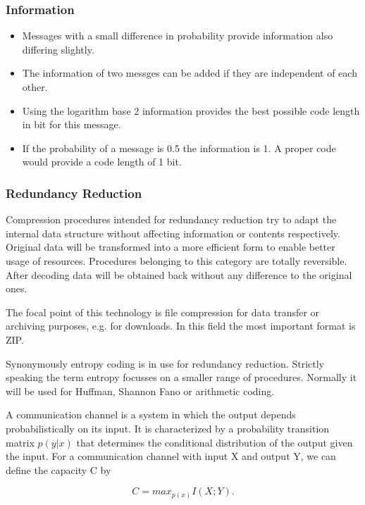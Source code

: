 
\begin{frame}
\frametitle{Information}
\begin{itemize}
\item Messages with a small difference in probability provide information also differing slightly. 
\item The information of two messges can be added if they are independent of each other.
\item Using the logarithm base 2 information provides the best possible code length in bit for this message. 
\item If the probability of a message is 0.5 the information is 1. A proper code would provide a code length of 1 bit. 
\end{itemize}
\end{frame}



\begin{frame}

\frametitle{Redundancy Reduction}

Compression procedures intended for redundancy reduction try to adapt the internal data structure without affecting information or contents respectively. Original data will be transformed into a more efficient form to enable better usage of resources. Procedures belonging to this category are totally reversible. After decoding data will be obtained back without any difference to the original ones.

The focal point of this technology is file compression for data transfer or archiving purposes, e.g. for downloads. In this field the most important format is ZIP.

Synonymously entropy coding is in use for redundancy reduction. Strictly speaking the term entropy focusses on a smaller range of procedures. Normally it will be used for Huffman, Shannon Fano or arithmetic coding.

\end{frame}
\begin{frame}


A communication channel is a system in which the output depends
probabilistically on its input. It is characterized by a probability transition
matrix $p(y|x)$ that determines the conditional distribution of the output
given the input. For a communication channel with input X and output
Y, we can define the capacity C by




\[C = max_{p(x)} I (X; Y).\]




\end{frame}



